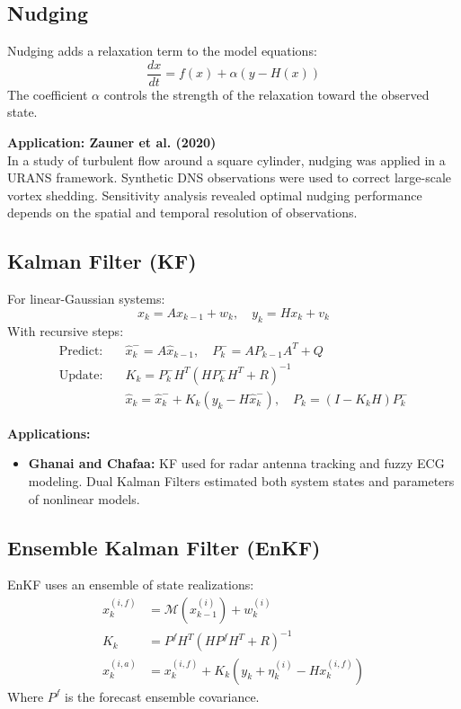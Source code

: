 \documentclass[a4paper]{article}
\begin{document}
\subsection{Nudging}

Nudging adds a relaxation term to the model equations:
\[
\frac{dx}{dt} = f(x) + \alpha(y - H(x))
\]
The coefficient $\alpha$ controls the strength of the relaxation toward the observed state.

\textbf{Application: Zauner et al. (2020)}\\
In a study of turbulent flow around a square cylinder, nudging was applied in a URANS framework. Synthetic DNS observations were used to correct large-scale vortex shedding. Sensitivity analysis revealed optimal nudging performance depends on the spatial and temporal resolution of observations.

\subsection{Kalman Filter (KF)}

For linear-Gaussian systems:
\[
x_k = A x_{k-1} + w_k, \quad y_k = H x_k + v_k
\]
With recursive steps:
\begin{align*}
\text{Predict:} & \quad \hat{x}_k^- = A \hat{x}_{k-1}, \quad P_k^- = A P_{k-1} A^T + Q \\
\text{Update:} & \quad K_k = P_k^- H^T (H P_k^- H^T + R)^{-1} \\
& \quad \hat{x}_k = \hat{x}_k^- + K_k (y_k - H \hat{x}_k^-), \quad P_k = (I - K_k H) P_k^-
\end{align*}

\textbf{Applications:}
\begin{itemize}
  \item \textbf{Ghanai and Chafaa:} KF used for radar antenna tracking and fuzzy ECG modeling. Dual Kalman Filters estimated both system states and parameters of nonlinear models.
\end{itemize}

\subsection{Ensemble Kalman Filter (EnKF)}

EnKF uses an ensemble of state realizations:
\begin{align*}
x_k^{(i,f)} &= \mathcal{M}(x_{k-1}^{(i)}) + w_k^{(i)} \\
K_k &= P^f H^T (H P^f H^T + R)^{-1} \\
x_k^{(i,a)} &= x_k^{(i,f)} + K_k(y_k + \eta_k^{(i)} - H x_k^{(i,f)})
\end{align*}
Where $P^f$ is the forecast ensemble covariance.
\end{document}

